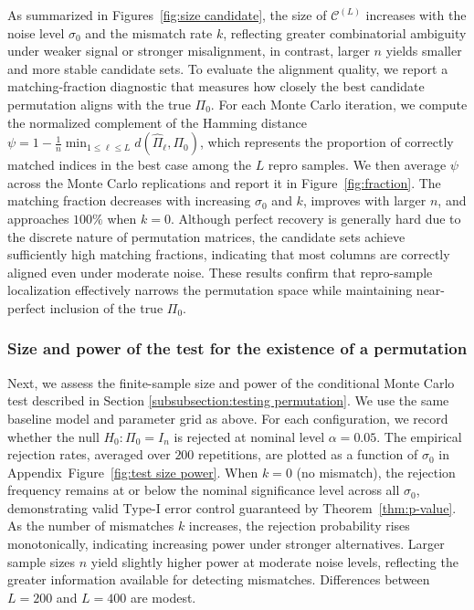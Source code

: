 \documentclass[11pt, reqno]{amsart}
\renewcommand{\le}{\leqslant}
\newcommand{\1}{\mbox{1}\hspace{-0.25em}\mbox{l}}
\theoremstyle{definition}\newtheorem{problem}{Problem}[section]
\theoremstyle{definition}\newtheorem{definition}[problem]{Definition}
\theoremstyle{remark}\newtheorem{assumption}{Assumption}
\theoremstyle{remark}\newtheorem{remark}[problem]{Remark}
\theoremstyle{definition}\newtheorem{example}[problem]{Example}
\theoremstyle{plain}\newtheorem{theorem}[problem]{Theorem}
\theoremstyle{plain}\newtheorem{question}[problem]{Question}
\theoremstyle{plain}\newtheorem{lemma}[problem]{Lemma}
\theoremstyle{plain}\newtheorem{proposition}[problem]{Proposition}
\theoremstyle{plain}\newtheorem{corollary}[problem]{Corollary}
\theoremstyle{plain}\newtheorem{conjecture}[problem]{Conjecture}
\begin{document}
As summarized in Figures~\ref{fig:size candidate},
the size of $\mathcal{C}^{(L)}$  increases with the noise level $\sigma_0$ and the mismatch rate $k$,
reflecting greater combinatorial ambiguity under weaker signal or stronger misalignment, in contrast, larger $n$ yields smaller and more stable candidate sets.
To evaluate the alignment quality, we report a matching-fraction diagnostic that measures
how closely the best candidate permutation aligns with the true $\Pi_0$.
For each Monte Carlo iteration, we compute the normalized complement of the
Hamming distance $
\psi = 1 - \frac{1}{n} \min_{1 \le \ell \le L} d(\widehat{\Pi}_\ell, \Pi_0)$,
which represents the proportion of correctly matched indices in the best case among the $L$ repro samples.
We then average $\psi$ across the Monte Carlo replications and report it in Figure~\ref{fig:fraction}.
The matching fraction decreases with increasing $\sigma_0$ and $k$,
improves with larger $n$, and approaches $100\%$ when $k=0$.
Although perfect recovery is generally hard due to the discrete nature of permutation matrices,
the candidate sets achieve sufficiently high matching fractions,
indicating that most columns are correctly aligned even under moderate noise.
These results confirm that repro-sample localization effectively narrows the permutation space
while maintaining near-perfect inclusion of the true $\Pi_0$.



\subsubsection{Size and power of the test for the existence of a permutation}
Next, we assess the finite-sample size and power of the conditional Monte Carlo test described in Section \ref{subsubsection:testing permutation}.
We use the same baseline model and parameter grid as above.
For each configuration, we record whether the null $H_0:\Pi_0=I_n$ is rejected at nominal level $\alpha=0.05$.
The empirical rejection rates, averaged over $200$ repetitions,
are plotted as a function of $\sigma_0$ in Appendix~Figure~\ref{fig:test size power}.
When $k=0$ (no mismatch), the rejection frequency remains at or below the nominal significance level across all $\sigma_0$,
demonstrating valid Type-I error control guaranteed by Theorem~\ref{thm:p-value}.
As the number of mismatches $k$ increases, the rejection probability rises monotonically, indicating increasing power under stronger alternatives.
Larger sample sizes $n$ yield slightly higher power at moderate noise levels, reflecting the greater information available for detecting mismatches.
Differences between $L=200$ and $L=400$ are modest.
\end{document}
